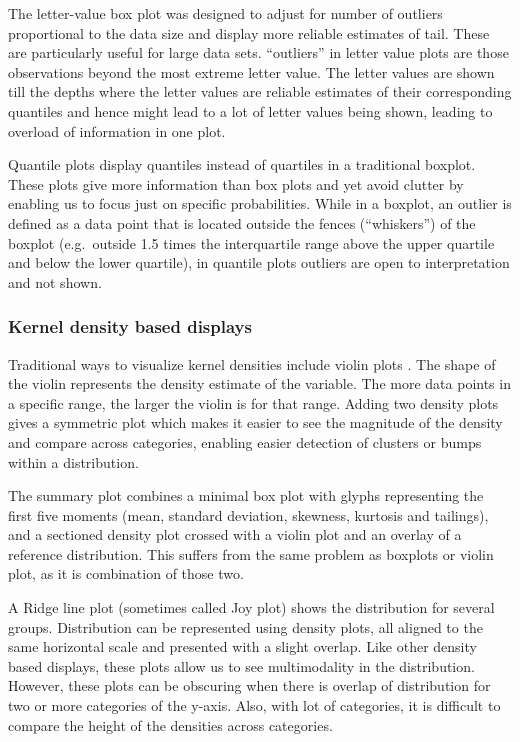 \documentclass[12pt]{article}
\begin{document}
The letter-value box plot \citep{Hofmann2017-sg} was designed to adjust for number of outliers proportional to the data size and display more reliable estimates of tail. These are particularly useful for large data sets. ``outliers'' in letter value plots are those observations beyond the most extreme letter value. The letter values are shown till the depths where the letter values are reliable estimates of their corresponding quantiles and hence might lead to a lot of letter values being shown, leading to overload of information in one plot.

Quantile plots display quantiles instead of quartiles in a traditional boxplot. These plots give more information than box plots and yet avoid clutter by enabling us to focus just on specific probabilities. While in a boxplot, an outlier is defined as a data point that is located outside the fences (``whiskers'') of the boxplot (e.g.~outside 1.5 times the interquartile range above the upper quartile and below the lower quartile), in quantile plots outliers are open to interpretation and not shown.

\hypertarget{kernel-density-based-displays}{%
\subsubsection{Kernel density based displays}\label{kernel-density-based-displays}}

Traditional ways to visualize kernel densities include violin plots \citep{Hintze1998-zi}. The shape of the violin represents the density estimate of the variable. The more data points in a specific range, the larger the violin is for that range. Adding two density plots gives a symmetric plot which makes it easier to see the magnitude of the density and compare across categories, enabling easier detection of clusters or bumps within a distribution.

The summary plot \citep{Potter2010-qc} combines a minimal box plot with glyphs representing the first five moments (mean, standard deviation, skewness, kurtosis and tailings), and a sectioned density plot crossed with a violin plot and an overlay of a reference distribution. This suffers from the same problem as boxplots or violin plot, as it is combination of those two.

A Ridge line plot (sometimes called Joy plot) shows the distribution for several groups. Distribution can be represented using density plots, all aligned to the same horizontal scale and presented with a slight overlap. Like other density based displays, these plots allow us to see multimodality in the distribution. However, these plots can be obscuring when there is overlap of distribution for two or more categories of the y-axis. Also, with lot of categories, it is difficult to compare the height of the densities across categories.
\end{document}
